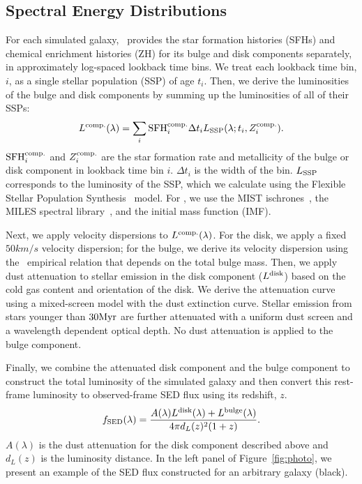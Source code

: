 \subsection{Spectral Energy Distributions} \label{sec:sed}
For each simulated galaxy, \lgal~provides the star formation histories (SFHs)
and chemical enrichment histories (ZH) for its bulge and disk components
separately, in approximately log-spaced lookback time bins. %
We treat each lookback time bin, $i$, as a single stellar population (SSP) of
age $t_i$.
Then, we derive the luminosities of the bulge and disk components by summing up
the luminosities of all of their SSPs:
\begin{equation}
    L^{\rm comp.}(\lambda) = \sum \limits_i {\rm SFH}^{\rm comp.}_i \Delta t_i L_{\rm
    SSP}(\lambda; t_i, Z^{\rm comp.}_i). 
\end{equation}
${\rm SFH}^{\rm comp.}_i$ and $Z^{\rm comp.}_i$ are the star formation rate and
metallicity of the bulge or disk component in lookback time bin $i$. 
$\Delta t_i$ is the width of the bin. 
$L_{\rm SSP}$ corresponds to the luminosity of the SSP, which we calculate
using the Flexible Stellar Population Synthesis~\citep[\fsps][]{conroy2009,
conroy2010c} model.
For \fsps, we use the MIST ischrones~\citep{paxton2011, paxton2013, paxton2015,
choi2016, dotter2016}, the MILES spectral library~\citep{sanchez_blazquez2006},
and the \cite{chabrier2003} initial mass function (IMF). 

Next, we apply velocity dispersions to $L^{\rm comp.}(\lambda)$.
For the disk, we apply a fixed $50 km/s$ velocity dispersion; for the bulge, we
derive its velocity dispersion using the~\cite{zahid2016} empirical relation
that depends on the total bulge mass.
Then, we apply dust attenuation to stellar emission in the disk component
($L^{\rm disk}$) based on the cold gas content and orientation of the disk. 
We derive the attenuation curve using a mixed-screen model with the
\cite{mathis1983} dust extinction curve. 
Stellar emission from stars younger than $30{\rm Myr}$ are further attenuated
with a uniform dust screen and a wavelength dependent optical depth.
No dust attenuation is applied to the bulge component.

Finally, we combine the attenuated disk component and the bulge component to
construct the total luminosity of the simulated galaxy and then convert this
rest-frame luminosity to observed-frame SED flux using its redshift, $z$.
\begin{equation}\label{eq:sed} 
    f_{\rm SED}(\lambda) = \frac{A(\lambda)L^{\rm disk}(\lambda) + L^{\rm bulge}(\lambda)}{4 \pi d_L(z)^2 (1+z)}.
\end{equation}
$A(\lambda)$ is the dust attenuation for the disk component described above 
and $d_L(z)$ is the luminosity distance.
In the left panel of Figure~\ref{fig:photo}, we present an example of the SED
flux constructed for an arbitrary \lgal galaxy (black).

